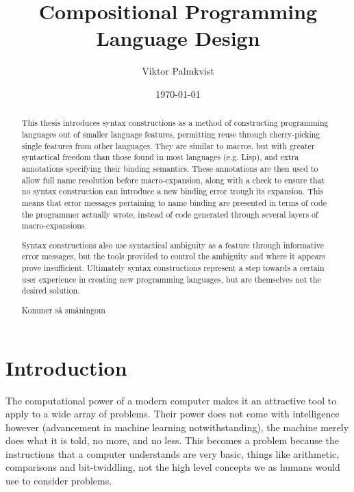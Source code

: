 \documentclass{kththesis}
\title{Compositional Programming Language Design}
\author{Viktor Palmkvist}
\date{\today}
\begin{document}
\frontmatter

\titlepage

\begin{abstract}
This thesis introduces syntax constructions as a method of constructing programming languages out of smaller language features, permitting reuse through cherry-picking single features from other languages. They are similar to macros, but with greater syntactical freedom than those found in most languages (e.g. Lisp), and extra annotations specifying their binding semantics. These annotations are then used to allow full name resolution before macro-expansion, along with a check to ensure that no syntax construction can introduce a new binding error trough its expansion. This means that error messages pertaining to name binding are presented in terms of code the programmer actually wrote, instead of code generated through several layers of macro-expansions.

Syntax constructions also use syntactical ambiguity as a feature through informative error messages, but the tools provided to control the ambiguity and where it appears prove insufficient. Ultimately syntax constructions represent a step towards a certain user experience in creating new programming languages, but are themselves not the desired solution.
\end{abstract}


\begin{otherlanguage}{swedish}
\begin{abstract}
Kommer så småningom
\end{abstract}
\end{otherlanguage}


\tableofcontents


\mainmatter

\chapter{Introduction} \label{sec:introduction}

The computational power of a modern computer makes it an attractive tool to apply to a wide array of problems. Their power does not come with intelligence however (advancement in machine learning notwithstanding), the machine merely does what it is told, no more, and no less. This becomes a problem because the instructions that a computer understands are very basic, things like arithmetic, comparisons and bit-twiddling, not the high level concepts we as humans would use to consider problems.
\end{document}
